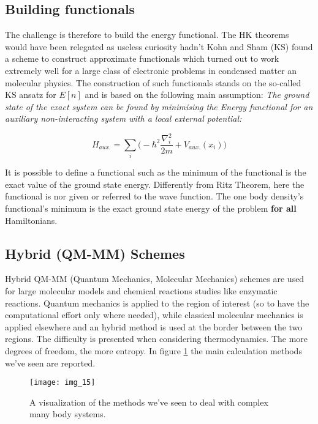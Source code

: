 \subsection{Building functionals}
The challenge is therefore to build the energy functional.
The HK theorems would have been relegated as useless curiosity hadn’t Kohn and Sham (KS) found a scheme to construct approximate functionals which turned out to work extremely well for a large class of electronic problems in condensed matter an molecular physics.
The construction of such functionals stands on the so-called KS ansatz for $E[n]$ and is based on the following main assumption: \textit{The ground state of the exact system can be found by minimising the Energy functional for an auxiliary non-interacting system with a local external potential:}

$$H_{aux.} = \sum_i \bigg(-\hbar^2 \frac{\nabla_i^2}{2m} + V_{aux.}(x_i) \bigg)$$

It is possible to define a functional such as the minimum of the functional is the exact value of the ground state energy.
Differently from Ritz Theorem, here the functional is nor given or referred to the wave function.
The one body density's functional's minimum is the exact ground state energy of the problem \textbf{for all} Hamiltonians.

\subsection{Hybrid (QM-MM) Schemes}
Hybrid QM-MM (Quantum Mechanics, Molecular Mechanics) schemes are used for large molecular models and chemical reactions studies like enzymatic reactions.
Quantum mechanics is applied to the region of interest (so to have the computational effort only where needed),  while classical molecular mechanics is applied elsewhere and an hybrid method is used at the border between the two regions.
The difficulty is presented when considering thermodynamics. The more degrees of freedom, the more entropy.
In figure \ref{fig:summary} the main calculation methods we've seen are reported.

\begin{figure}[htbp!]
	\centering
	\texttt{[image: img\_15]}
	\caption{A visualization of the methods we've seen to deal with complex many body systems.}
	\label{fig:summary}
\end{figure}
